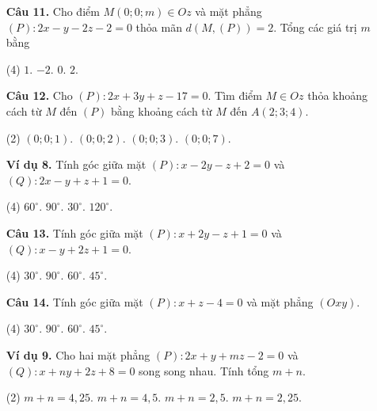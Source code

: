 \documentclass[12pt, a4paper]{article}
\begin{document}
\begin{enumerate}[label=\textbf{\arabic*.}, wide=0pt, leftmargin=*]
    \item[\textbf{Câu 11.}] Cho điểm \(M(0;0;m) \in Oz\) và mặt phẳng \((P) : 2x - y - 2z - 2 = 0\) thỏa mãn \(d(M, (P)) = 2\). Tổng các giá trị \(m\) bằng
    \begin{tasks}(4)
        \task \(1\).
        \task \(-2\).
        \task \(0\).
        \task \(2\).
    \end{tasks}
    
    \item[\textbf{Câu 12.}] Cho \((P) : 2x + 3y + z - 17 = 0\). Tìm điểm \(M \in Oz\) thỏa khoảng cách từ \(M\) đến \((P)\) bằng khoảng cách từ \(M\) đến \(A(2;3;4)\).
    \begin{tasks}(2)
        \task \((0;0;1)\).
        \task \((0;0;2)\).
        \task \((0;0;3)\).
        \task \((0;0;7)\).
    \end{tasks}
    
    \item[\textbf{Ví dụ 8.}] Tính góc giữa mặt \((P) : x - 2y - z + 2 = 0\) và \((Q) : 2x - y + z + 1 = 0\).
    \begin{tasks}(4)
        \task \(60^\circ\).
        \task \(90^\circ\).
        \task \(30^\circ\).
        \task \(120^\circ\).
    \end{tasks}
    
    
    \item[\textbf{Câu 13.}] Tính góc giữa mặt \((P) : x + 2y - z + 1 = 0\) và \((Q) : x - y + 2z + 1 = 0\).
    \begin{tasks}(4)
        \task \(30^\circ\).
        \task \(90^\circ\).
        \task \(60^\circ\).
        \task \(45^\circ\).
    \end{tasks}
    
    \item[\textbf{Câu 14.}] Tính góc giữa mặt \((P) : x + z - 4 = 0\) và mặt phẳng \((Oxy)\).
    \begin{tasks}(4)
        \task \(30^\circ\).
        \task \(90^\circ\).
        \task \(60^\circ\).
        \task \(45^\circ\).
    \end{tasks}
    
    \item[\textbf{Ví dụ 9.}] Cho hai mặt phẳng \((P) : 2x + y + mz - 2 = 0\) và \((Q) : x + ny + 2z + 8 = 0\) song song nhau. Tính tổng \(m+n\).
    \begin{tasks}(2)
        \task \(m+n = 4,25\).
        \task \(m+n = 4,5\).
        \task \(m+n = 2,5\).
        \task \(m+n = 2,25\).
    \end{tasks}
    

\end{enumerate}
\end{document}
